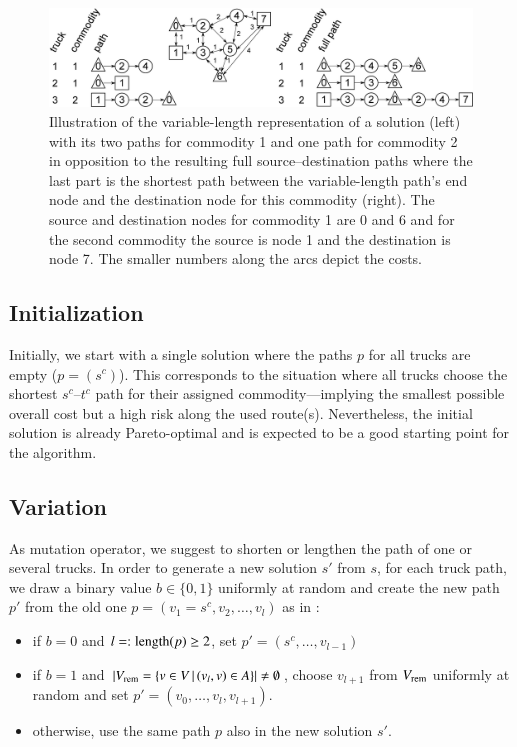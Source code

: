 \documentclass[preprint,12pt]{elsarticle}
\begin{document}
\begin{figure}%
\includegraphics[width=\columnwidth]{figs/truckpaths}%
\caption{\label{fig:paths} Illustration of the variable-length representation of a solution (left) with its two paths for commodity 1 and one path for commodity 2 in opposition to the resulting full source--destination paths where the last part is the shortest path between the variable-length path's end node and the destination node for this commodity (right). The source and destination nodes for commodity 1 are 0 and 6 and for the second commodity the source is node 1 and the destination is node 7. The smaller numbers along the arcs depict the costs.}
\end{figure}


\subsection{Initialization}\label{sec:init}
Initially, we start with a single solution where the paths $p$ for all trucks are empty ($p=(s^c)$). This corresponds to the situation where all trucks choose the shortest $s^c$--$t^c$ path for their assigned commodity---implying the smallest possible overall cost but a high risk along the used route(s). Nevertheless, the initial solution is already Pareto-optimal and is expected to be a good starting point for the algorithm.

\subsection{Variation}\label{sec:variation}
As mutation operator, we suggest to shorten or lengthen the path of one or several trucks. In order to generate a new solution $s'$ from $s$, for each truck path, we draw a binary value $b\in\{0,1\}$ uniformly at random and create the new path $p'$ from the old one $p=(v_1=s^c,v_2,\ldots, v_l)$ as in \citep{horo2009a}:
\begin{itemize}
	\item if $b = 0$ and $l=:\textnormal{length}(p)\geq 2$, set $p' = (s^c, \ldots, v_{l-1})$	
	\item if $b = 1$ and $|V_{\textnormal{\scriptsize rem}}=\{v \in V \,|\, (v_{l}, v) \in A\}| \neq\emptyset$, choose $v_{l+1}$ from $V_{\textnormal{\scriptsize rem}}$ uniformly at random and set $p' = (v_0, \ldots, v_l, v_{l+1})$.
	\item otherwise, use the same path $p$ also in the new solution $s'$.
\end{itemize}
\end{document}
